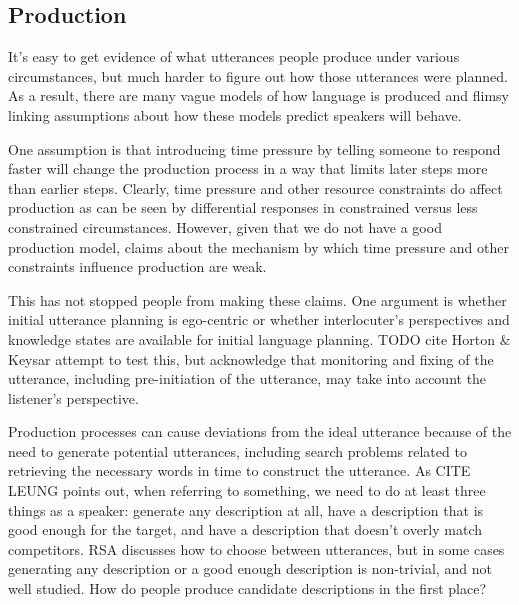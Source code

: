 \documentclass[]{article}
\begin{document}
\subsection{Production}
It's easy to get evidence of what utterances people produce under various circumstances, but much harder to figure out how those utterances were planned. As a result, there are many vague models of how language is produced and flimsy linking assumptions about how these models predict speakers will behave. 


One assumption is that introducing time pressure by telling someone to respond faster will change the production process in a way that limits later steps more than earlier steps. Clearly, time pressure and other resource constraints do affect production as can be seen by differential responses in constrained versus less constrained circumstances. However, given that we do not have a good production model, claims about the mechanism by which time pressure and other constraints influence production are weak.

This has not stopped people from making these claims. One argument is whether initial utterance planning is ego-centric or whether interlocuter's perspectives and knowledge states are available for initial language planning. TODO cite Horton \& Keysar attempt to test this, but acknowledge that monitoring and fixing of the utterance, including pre-initiation of the utterance, may take into account the listener's perspective. %

%



Production processes can cause deviations from the ideal utterance because of the need to generate potential utterances, including search problems related to retrieving the necessary words in time to construct the utterance. As CITE LEUNG points out, when referring to something, we need to do at least three things as a speaker: generate any description at all, have a description that is good enough for the target, and have a description that doesn't overly match competitors. RSA discusses how to choose between utterances, but in some cases generating any description or a good enough description is non-trivial, and not well studied. How do people produce candidate descriptions in the first place? 
\end{document}
